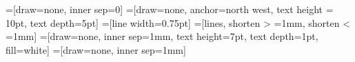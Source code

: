 \usetikzlibrary{shapes.geometric, arrows.meta, snakes, calc, decorations.pathmorphing}

=[draw=none, inner sep=0]
=[draw=none, anchor=north west, text height = 10pt, text depth=5pt]
=[line width=0.75pt]
=[lines, shorten > =1mm, shorten < =1mm]
=[draw=none, inner sep=1mm, text height=7pt, text depth=1pt, fill=white]
=[draw=none, inner sep=1mm]